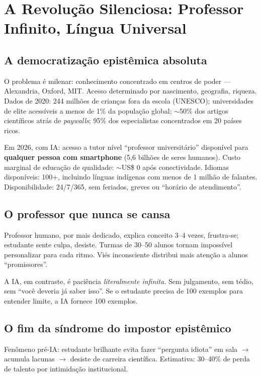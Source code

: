 \documentclass[12pt, a4paper]{article}
\begin{document}
\section{A Revolução Silenciosa: Professor Infinito, Língua Universal}\label{sec:revolucao}

\subsection{A democratização epistêmica absoluta}\label{sec:democratizacao}

O problema é milenar: conhecimento concentrado em centros de poder --- Alexandria, Oxford, MIT. Acesso determinado por nascimento, geografia, riqueza. Dados de 2020: 244 milhões de crianças fora da escola (UNESCO); universidades de elite acessíveis a menos de 1\% da população global; $\sim$50\% dos artigos científicos atrás de \textit{paywalls}; 95\% dos especialistas concentrados em 20 países ricos.

Em 2026, com IA: acesso a tutor nível ``professor universitário'' disponível para \textbf{qualquer pessoa com smartphone} (5,6 bilhões de seres humanos). Custo marginal de educação de qualidade: $\sim$US\$ 0 após conectividade. Idiomas disponíveis: 100+, incluindo línguas indígenas com menos de 1 milhão de falantes. Disponibilidade: 24/7/365, sem feriados, greves ou ``horário de atendimento''.

\subsection{O professor que nunca se cansa}\label{sec:professor_infinito}

Professor humano, por mais dedicado, explica conceito 3--4 vezes, frustra-se; estudante sente culpa, desiste. Turmas de 30--50 alunos tornam impossível personalizar para cada ritmo. Viés inconsciente distribui mais atenção a alunos ``promissores''.

A IA, em contraste, é paciência \textit{literalmente infinita}. Sem julgamento, sem tédio, sem ``você deveria já saber isso''. Se o estudante precisa de 100 exemplos para entender limite, a IA fornece 100 exemplos.

\subsection{O fim da síndrome do impostor epistêmico}\label{sec:impostor}

Fenômeno pré-IA: estudante brilhante evita fazer ``pergunta idiota'' em sala $\to$ acumula lacunas $\to$ desiste de carreira científica. Estimativa: 30--40\% de perda de talento por intimidação institucional.
\end{document}
